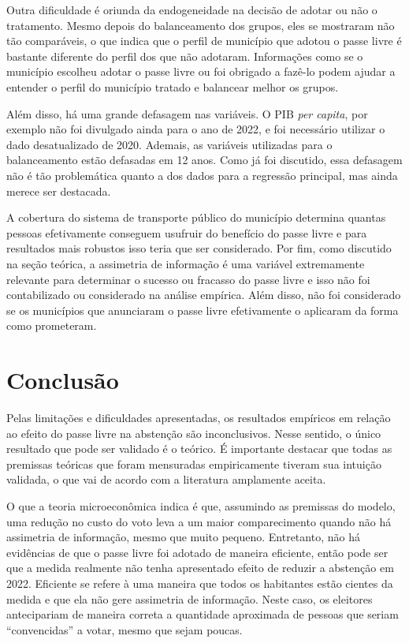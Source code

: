 Outra dificuldade é oriunda da endogeneidade na decisão de adotar ou não o tratamento. Mesmo depois do balanceamento dos grupos, eles se mostraram não tão comparáveis, o que indica que o perfil de município que adotou o passe livre é bastante diferente do perfil dos que não adotaram. Informações como se o município escolheu adotar o passe livre ou foi obrigado a fazê-lo podem ajudar a entender o perfil do município tratado e balancear melhor os grupos.

Além disso, há uma grande defasagem nas variáveis. O PIB \textit{per capita}, por exemplo não foi divulgado ainda para o ano de 2022, e foi necessário utilizar o dado desatualizado de 2020. Ademais, as variáveis utilizadas para o balanceamento estão defasadas em 12 anos. Como já foi discutido, essa defasagem não é tão problemática quanto a dos dados para a regressão principal, mas ainda merece ser destacada.

A cobertura do sistema de transporte público do município determina quantas pessoas efetivamente conseguem usufruir do benefício do passe livre e para resultados mais robustos isso teria que ser considerado. Por fim, como discutido na seção teórica, a assimetria de informação é uma variável extremamente relevante para determinar o sucesso ou fracasso do passe livre e isso não foi contabilizado ou considerado na análise empírica. Além disso, não foi considerado se os municípios que anunciaram o passe livre efetivamente o aplicaram da forma como prometeram.

\section{Conclusão}

Pelas limitações e dificuldades apresentadas, os resultados empíricos em relação ao efeito do passe livre na abstenção são inconclusivos. Nesse sentido, o único resultado que pode ser validado é o teórico. É importante destacar que todas as premissas teóricas que foram mensuradas empiricamente tiveram sua intuição validada, o que vai de acordo com a literatura amplamente aceita. 

O que a teoria microeconômica indica é que, assumindo as premissas do modelo, uma redução no custo do voto leva a um maior comparecimento quando não há assimetria de informação, mesmo que muito pequeno. Entretanto, não há evidências de que o passe livre foi adotado de maneira eficiente, então pode ser que a medida realmente não tenha apresentado efeito de reduzir a abstenção em 2022. Eficiente se refere à uma maneira que todos os habitantes estão cientes da medida e que ela não gere assimetria de informação. Neste caso, os eleitores antecipariam de maneira correta a quantidade aproximada de pessoas que seriam ``convencidas'' a votar, mesmo que sejam poucas.

